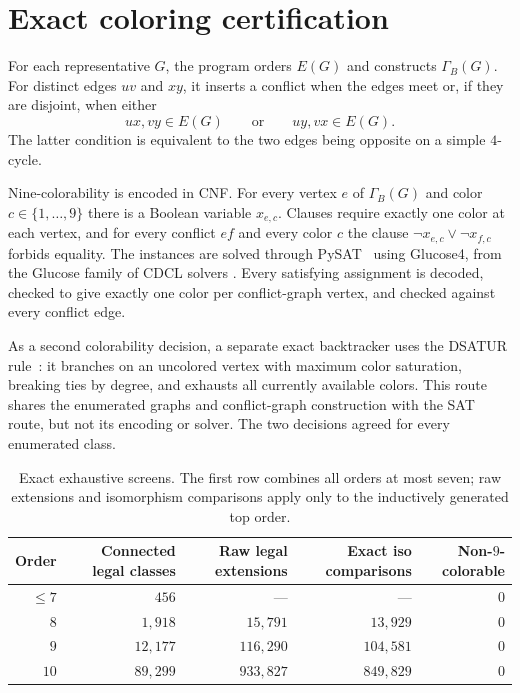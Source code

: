 \documentclass[11pt]{article}
\newcommand{\GB}{\Gamma_{B}}
\begin{document}
\section{Exact coloring certification}

For each representative $G$, the program orders $E(G)$ and constructs
$\GB(G)$.  For distinct edges $uv$ and $xy$, it inserts a conflict when the
edges meet or, if they are disjoint, when either
\[
  ux,vy\in E(G) \qquad\text{or}\qquad uy,vx\in E(G).
\]
The latter condition is equivalent to the two edges being opposite on a
simple $4$-cycle.

Nine-colorability is encoded in CNF.  For every vertex $e$ of $\GB(G)$ and
color $c\in\{1,\dots,9\}$ there is a Boolean variable $x_{e,c}$.  Clauses
require exactly one color at each vertex, and for every conflict $ef$ and
every color $c$ the clause $\neg x_{e,c}\lor\neg x_{f,c}$ forbids equality.
The instances are solved through PySAT~\cite{IgnatievMorgadoMarquesSilva2018}
using Glucose4, from the Glucose family of CDCL solvers
\cite{AudemardSimon2009}.  Every satisfying assignment is decoded, checked
to give exactly one color per conflict-graph vertex, and checked against every
conflict edge.

As a second colorability decision, a separate exact backtracker uses the
DSATUR rule~\cite{Brelaz1979}: it branches on an uncolored vertex with maximum
color saturation, breaking ties by degree, and exhausts all currently
available colors.  This route shares the enumerated graphs and conflict-graph
construction with the SAT route, but not its encoding or solver.  The two
decisions agreed for every enumerated class.

\begin{table}[ht]
\centering
\caption{Exact exhaustive screens.  The first row combines all orders at
most seven; raw extensions and isomorphism comparisons apply only to the
inductively generated top order.}
\label{tab:counts}
\begin{tabular}{@{}rrrrr@{}}
\toprule
Order & Connected legal classes & Raw legal extensions & Exact iso comparisons
  & Non-$9$-colorable \\
\midrule
$\leq 7$ & $456$    & ---       & ---       & $0$ \\
$8$       & $1{,}918$  & $15{,}791$  & $13{,}929$  & $0$ \\
$9$       & $12{,}177$ & $116{,}290$ & $104{,}581$ & $0$ \\
$10$      & $89{,}299$ & $933{,}827$ & $849{,}829$ & $0$ \\
\bottomrule
\end{tabular}
\end{table}
\end{document}
